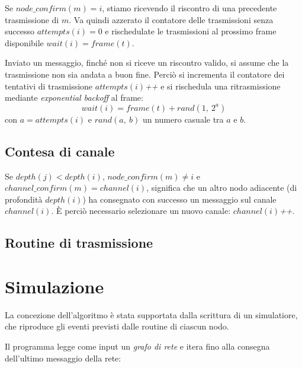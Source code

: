 \documentclass[a4paper,12pt]{article}
\theoremstyle{definition}
\begin{document}
Se $node\_confirm(m) = i$, stiamo ricevendo il riscontro di una precedente trasmissione di $m$. Va quindi azzerato il contatore delle trasmissioni senza successo $attempts(i) = 0$ e rischedulate le trasmissioni al prossimo frame disponibile $wait(i) = frame(t)$.

Inviato un messaggio, finché non si riceve un riscontro valido, si assume che la trasmissione non sia andata a buon fine. Perciò si incrementa il contatore dei tentativi di trasmissione $attempts(i)$\textit{++} e si rischedula una ritrasmissione mediante \emph{exponential backoff} al frame:
\begin{equation*}
wait(i) = frame(t) + rand(1,\ 2^a)
\end{equation*}
con $a = attempts(i)$ e $rand(a,\ b)$ un numero casuale tra $a$ e $b$.

\subsection{Contesa di canale}

Se $depth(j) < depth(i)$, $node\_confirm(m) \neq i$ e $channel\_confirm(m) = channel(i)$, significa che un altro nodo adiacente (di profondità $depth(i)$) ha consegnato con successo un messaggio sul canale $channel(i)$. È perciò necessario selezionare un nuovo canale: $channel(i)$\textit{++}.

\subsection{Routine di trasmissione}


\section{Simulazione}


La concezione dell'algoritmo è stata supportata dalla scrittura di un simulatiore, che riproduce gli eventi previsti dalle routine di ciascun nodo.

Il programma legge come input un \emph{grafo di rete} e itera fino alla consegna dell'ultimo messaggio della rete:
\end{document}
